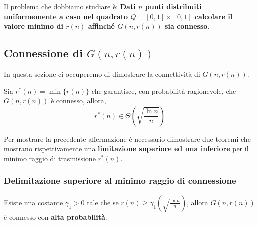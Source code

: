 Il problema che dobbiamo studiare è:
\textbf{Dati $n$ punti distribuiti uniformemente a caso nel quadrato $Q = [0, 1] \times [0, 1]$ calcolare il valore minimo di $r(n)$ affinché $G(n, r(n))$ sia connesso}.

\subsection{Connessione di $G(n, r(n))$}

In questa sezione ci occuperemo di dimostrare la connettività di $G(n, r(n))$.

\begin{teorema}[Connessione di $G(n, r(n))$]
    Sia $r^*(n) = \min\{r(n)\}$ che garantisce, con probabilità ragionevole, che $G(n, r(n))$ è connesso, allora,
    \[
    r^*(n) \in \Theta\left(\sqrt{\frac{\ln n}{n}}\right)
    \]
\end{teorema}

Per mostrare la precedente affermazione è necessario dimostrare due teoremi che mostrano rispettivamente una \textbf{limitazione superiore ed una inferiore} per il minimo raggio di trasmissione $r^*(n)$.

\subsubsection{Delimitazione superiore al minimo raggio di connessione}

 \begin{teorema}
    Esiste una costante $\gamma_1 > 0$ tale che se $r(n) \geq \gamma_1 \left(\sqrt{\frac{\ln n}{n}}\right)$, allora $G(n, r(n))$ è connesso con \textbf{alta probabilità}.
\end{teorema}

